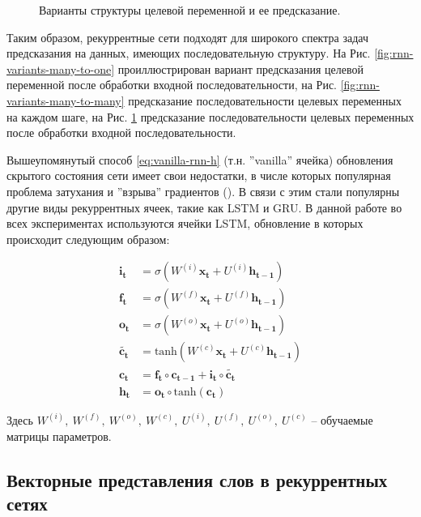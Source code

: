 \documentclass[12pt,a4paper]{amsart}
\begin{document}
\begin{figure}[!h]
\begin{subfigure}{0.31\textwidth}
		\caption{}
		\label{fig:rnn-variants-many-to-many-seq2seq}
	\end{subfigure}
	\caption{Варианты структуры целевой переменной и ее предсказание.}
	\label{fig:rnn-variants}
\end{figure}

Таким образом, рекуррентные сети подходят для широкого спектра задач предсказания на данных, имеющих последовательную структуру. На Рис. \ref{fig:rnn-variants-many-to-one} проиллюстрирован вариант предсказания целевой переменной после обработки входной последовательности, на Рис. \ref{fig:rnn-variants-many-to-many} предсказание последовательности целевых переменных на каждом шаге, на Рис. \ref{fig:rnn-variants-many-to-many-seq2seq} предсказание последовательности целевых переменных после обработки входной последовательности.

Вышеупомянутый способ \eqref{eq:vanilla-rnn-h} (т.н. ''vanilla'' ячейка) обновления скрытого состояния сети имеет свои недостатки, в числе которых популярная проблема затухания и ''взрыва'' градиентов (\cite{Hochreiter:1997:LSM:1246443.1246450}). В связи с этим стали популярны другие виды рекуррентных ячеек, такие как LSTM и GRU. В данной работе во всех экспериментах используются ячейки LSTM, обновление в которых происходит следующим образом:

\begin{align*} \label{eq:lstm-equations}
\mathbf{i_t} &= \sigma(W^{(i)}\mathbf{x_t} + U^{(i)}\mathbf{h_{t-1}}) \\
\mathbf{f_t} &= \sigma(W^{(f)}\mathbf{x_t} + U^{(f)}\mathbf{h_{t-1}}) \\
\mathbf{o_t} &= \sigma(W^{(o)}\mathbf{x_t} + U^{(o)}\mathbf{h_{t-1}}) \\
\mathbf{\tilde{c_t}} &= \text{tanh}(W^{(c)}\mathbf{x_t} + U^{(c)}\mathbf{h_{t-1}}) \\
\mathbf{c_t} &= \mathbf{f_t} \circ \mathbf{c_{t-1}} + \mathbf{i_t} \circ \mathbf{\tilde{c_t}} \\
\mathbf{h_t} &= \mathbf{o_t} \circ \text{tanh}(\mathbf{c_t})
\end{align*}

Здесь $W^{(i)},~ W^{(f)},~ W^{(o)},~ W^{(c)},~ U^{(i)},~ U^{(f)},~ U^{(o)},~ U^{(c)}$ -- обучаемые матрицы параметров.

\subsection{Векторные представления слов в рекуррентных сетях}
\end{document}
